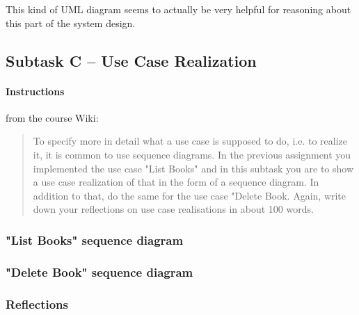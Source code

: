 This kind of UML diagram seems to actually be very helpful for reasoning about
this part of the system design.



\subsection{Subtask C -- Use Case Realization}\label{task-1c}
\paragraph{Instructions}\label{task-1c-instructions}
from the course Wiki\cite{1dv600:lab2:instructions}:

\begin{quote}
  To specify more in detail what a use case is supposed to do, i.e. to realize
  it, it is common to use sequence diagrams. In the previous assignment you
  implemented the use case "List Books" and in this subtask you are to show a
  use case realization of that in the form of a sequence diagram. In addition
  to that, do the same for the use case "Delete Book.  Again, write down your
  reflections on use case realisations in about 100 words.
\end{quote}


\subsubsection{"List Books" sequence diagram}\label{task-1c-sequence1}
%


\subsubsection{"Delete Book" sequence diagram}\label{task-1c-sequence2}
%


\subsubsection{Reflections}\label{task-1c-reflect}
%

